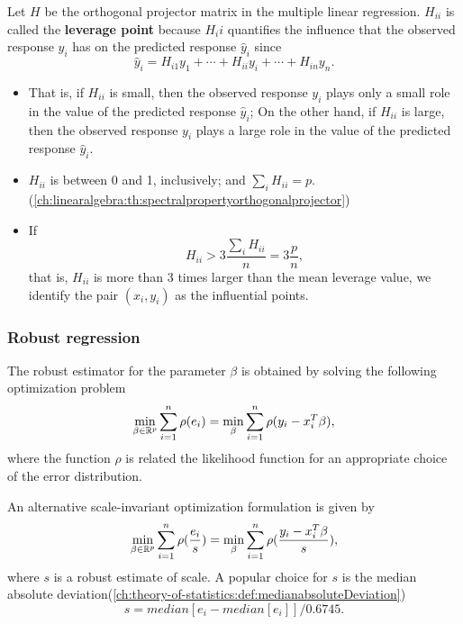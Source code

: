 \begin{refsection}
\begin{definition}[leverage]
Let $H$ be the orthogonal projector matrix in the multiple linear regression. $H_{ii}$ is called the \textbf{leverage point} because $H_ii$ quantifies the influence that the observed response $y_i$ has on the predicted response $\hat{y}_i$ since
$$\hat{y}_i = H_{i1}y_1 + \cdots + H_{ii}y_i + \cdots + H_{in}y_n.$$	
\end{definition}



\begin{note}\hfill
\begin{itemize}
	\item That is, if $H_{ii}$ is small, then the observed response $y_i$ plays only a small role in the value of the predicted response $\hat{y}_i$; On the other hand, if $H_{ii}$ is large, then the observed response $y_i$ plays a large role in the value of the predicted response $\hat{y}_i$.
	\item $H_{ii}$ is between 0 and 1, inclusively; and $\sum_i H_{ii} = p$.(\autoref{ch:linearalgebra:th:spectralpropertyorthogonalprojector})
	\item If $$H_{ii} > 3\frac{\sum_i H_{ii}}{n} = 3\frac{p}{n},$$
	that is, $H_{ii}$ is more than 3 times larger than the mean leverage value, we identify the pair $(x_i,y_i)$ as the influential points. 
\end{itemize}	
	
\end{note}






\subsubsection{Robust regression}



\begin{lemma}
The robust estimator for the parameter $\beta$ is obtained by solving the following optimization problem	
$$\min_{\beta \in \mathbb{R}^p} \sum_{i=1}^{n} \rho(e_i) = \min_{\beta} \sum_{i=1}^{n} \rho(y_i - x_i^T\beta),$$
where the function $\rho$ is related the likelihood function for an appropriate choice of the error distribution.

An alternative scale-invariant optimization formulation is given by
$$\min_{\beta \in \mathbb{R}^p} \sum_{i=1}^{n} \rho(\frac{e_i}{s}) = \min_{\beta} \sum_{i=1}^{n} \rho(\frac{y_i - x_i^T\beta}{s}),$$
where $s$ is a robust estimate of scale. A popular choice for $s$ is the median absolute deviation(\autoref{ch:theory-of-statistics:def:medianabsoluteDeviation})
$$s = median[e_i - median[e_i]]/0.6745.$$	
\end{lemma}



\end{refsection}
